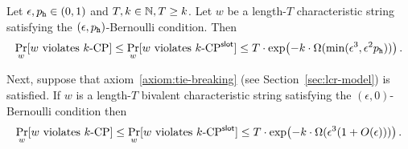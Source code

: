   \begin{theorem} \label{thm:main-mh-CP} Let
    $\epsilon, p_{\mathtt{h}} \in (0,1)$ and $T, k \in \mathbb{N}, T \geq k$. 
    Let $w$ be a length-$T$ characteristic string satisfying the $(\epsilon, p_{\mathtt{h}})$-Bernoulli condition. 
    Then
    $$
      \Pr_{w}[\text{$w$ violates ${k}\text{-}\mathrm{CP}$}] 
        \leq 
      \Pr_{w}[\text{$w$ violates ${k}\text{-}\mathrm{CP}^{\mathsf{slot}}$}] 
        \leq T \cdot 
        \exp\bigl(-k\cdot \Omega(\min(\epsilon^3, \epsilon^2 p_{\mathtt{h}}))\bigr)
        \,.
    $$
    
    Next, suppose that axiom~\ref{axiom:tie-breaking} (see Section~\ref{sec:lcr-model}) is satisfied. 
    If $w$ is a length-$T$ bivalent characteristic string satisfying the $(\epsilon, 0)$-Bernoulli condition 
    then
    $$
      \Pr_{w}[\text{$w$ violates ${k}\text{-}\mathrm{CP}$}] 
        \leq 
      \Pr_{w}[\text{$w$ violates ${k}\text{-}\mathrm{CP}^{\mathsf{slot}}$}] 
        \leq T \cdot 
        \exp\bigl(-k \cdot \Omega(\epsilon^3 (1 + O(\epsilon)))\bigr)
        \,.
    $$
  \end{theorem}
